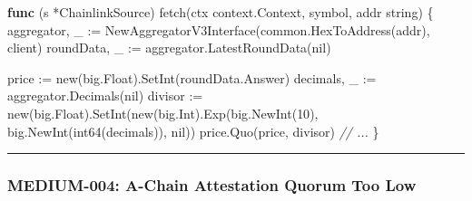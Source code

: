 \documentclass[
]{article}
\newenvironment{Shaded}{}{}
\newcommand{\BuiltInTok}[1]{\textcolor[rgb]{0.00,0.50,0.00}{#1}}
\newcommand{\CommentTok}[1]{\textcolor[rgb]{0.38,0.63,0.69}{\textit{#1}}}
\newcommand{\DataTypeTok}[1]{\textcolor[rgb]{0.56,0.13,0.00}{#1}}
\newcommand{\DecValTok}[1]{\textcolor[rgb]{0.25,0.63,0.44}{#1}}
\newcommand{\KeywordTok}[1]{\textcolor[rgb]{0.00,0.44,0.13}{\textbf{#1}}}
\newcommand{\NormalTok}[1]{#1}
\newcommand{\OperatorTok}[1]{\textcolor[rgb]{0.40,0.40,0.40}{#1}}
\newcommand{\OtherTok}[1]{\textcolor[rgb]{0.00,0.44,0.13}{#1}}
\begin{document}
\begin{Shaded}
\begin{Highlighting}[]
\KeywordTok{func} \OperatorTok{(}\NormalTok{s }\OperatorTok{*}\NormalTok{ChainlinkSource}\OperatorTok{)}\NormalTok{ fetch}\OperatorTok{(}\NormalTok{ctx context}\OperatorTok{.}\NormalTok{Context}\OperatorTok{,}\NormalTok{ symbol}\OperatorTok{,}\NormalTok{ addr }\DataTypeTok{string}\OperatorTok{)} \OperatorTok{\{}
\NormalTok{    aggregator}\OperatorTok{,}\NormalTok{ \_ }\OperatorTok{:=}\NormalTok{ NewAggregatorV3Interface}\OperatorTok{(}\NormalTok{common}\OperatorTok{.}\NormalTok{HexToAddress}\OperatorTok{(}\NormalTok{addr}\OperatorTok{),}\NormalTok{ client}\OperatorTok{)}
\NormalTok{    roundData}\OperatorTok{,}\NormalTok{ \_ }\OperatorTok{:=}\NormalTok{ aggregator}\OperatorTok{.}\NormalTok{LatestRoundData}\OperatorTok{(}\OtherTok{nil}\OperatorTok{)}
    
\NormalTok{    price }\OperatorTok{:=} \BuiltInTok{new}\OperatorTok{(}\NormalTok{big}\OperatorTok{.}\NormalTok{Float}\OperatorTok{).}\NormalTok{SetInt}\OperatorTok{(}\NormalTok{roundData}\OperatorTok{.}\NormalTok{Answer}\OperatorTok{)}
\NormalTok{    decimals}\OperatorTok{,}\NormalTok{ \_ }\OperatorTok{:=}\NormalTok{ aggregator}\OperatorTok{.}\NormalTok{Decimals}\OperatorTok{(}\OtherTok{nil}\OperatorTok{)}
\NormalTok{    divisor }\OperatorTok{:=} \BuiltInTok{new}\OperatorTok{(}\NormalTok{big}\OperatorTok{.}\NormalTok{Float}\OperatorTok{).}\NormalTok{SetInt}\OperatorTok{(}\BuiltInTok{new}\OperatorTok{(}\NormalTok{big}\OperatorTok{.}\NormalTok{Int}\OperatorTok{).}\NormalTok{Exp}\OperatorTok{(}\NormalTok{big}\OperatorTok{.}\NormalTok{NewInt}\OperatorTok{(}\DecValTok{10}\OperatorTok{),}\NormalTok{ big}\OperatorTok{.}\NormalTok{NewInt}\OperatorTok{(}\DataTypeTok{int64}\OperatorTok{(}\NormalTok{decimals}\OperatorTok{)),} \OtherTok{nil}\OperatorTok{))}
\NormalTok{    price}\OperatorTok{.}\NormalTok{Quo}\OperatorTok{(}\NormalTok{price}\OperatorTok{,}\NormalTok{ divisor}\OperatorTok{)}
    \CommentTok{// ...}
\OperatorTok{\}}
\end{Highlighting}
\end{Shaded}

\begin{center}\rule{0.5\linewidth}{0.5pt}\end{center}

\subsubsection{MEDIUM-004: A-Chain Attestation Quorum Too
Low}\label{medium-004-a-chain-attestation-quorum-too-low}
\end{document}
